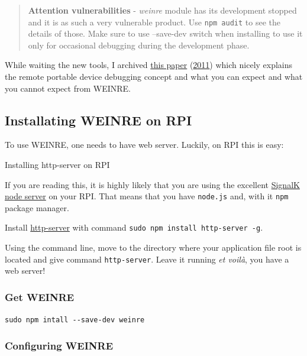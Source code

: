 \documentclass[11pt]{article}
\begin{document}
    \begin{quote}
\textbf{Attention vulnerabilities} - \emph{weinre} module has its
development stopped and it is as such a very vulnerable product. Use
\texttt{npm\ audit} to see the details of those. Make sure to use
--save-dev switch when installing to use it only for occasional
debugging during the development phase.
\end{quote}

    While waiting the new tools, I archived
\href{pdf/debugging_mobile_javascript_with_WEINRE_ibm_blog_2011.pdf}{this
paper}
(\href{https://www.ibm.com/developerworks/community/blogs/94e7fded-7162-445e-8ceb-97a2140866a9/entry/debugging_mobile_javascript_with_weinre?lang=en}{2011})
which nicely explains the remote portable device debugging concept and
what you can expect and what you cannot expect from WEINRE.

    \hypertarget{installating-weinre-on-rpi}{%
\subsection{Installating WEINRE on
RPI}\label{installating-weinre-on-rpi}}

    To use WEINRE, one needs to have web server. Luckily, on RPI this is
easy:

    Installing http-server on RPI

    If you are reading this, it is highly likely that you are using the
excellent
\href{https://github.com/SignalK/signalk-server-node/blob/master/raspberry_pi_installation.md}{SignalK
node server} on your RPI. That means that you have \texttt{node.js} and,
with it \texttt{npm} package manager.

    Install \href{https://www.npmjs.com/package/http-server}{http-server}
with command \texttt{sudo\ npm\ install\ http-server\ -g}.

    Using the command line, move to the directory where your application
file root is located and give command \texttt{http-server}. Leave it
running \emph{et voilà}, you have a web server!

    \hypertarget{get-weinre}{%
\subsubsection{Get WEINRE}\label{get-weinre}}

    \texttt{sudo\ npm\ intall\ -\/-save-dev\ weinre}

    \hypertarget{configuring-weinre}{%
\subsubsection{Configuring WEINRE}\label{configuring-weinre}}
\end{document}
